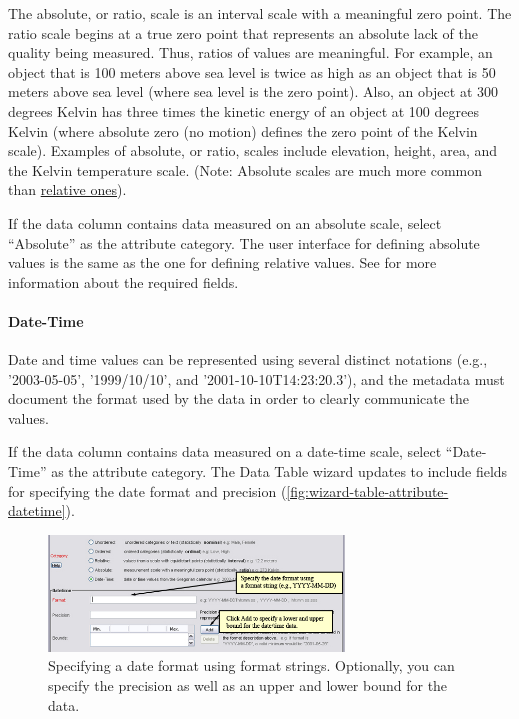 The absolute, or ratio, scale is an interval scale with a meaningful
zero point. The ratio scale begins at a true zero point that represents
an absolute lack of the quality being measured. Thus, ratios of values
are meaningful. For example, an object that is 100 meters above sea
level is twice as high as an object that is 50 meters above sea level
(where sea level is the zero point). Also, an object at 300 degrees
Kelvin has three times the kinetic energy of an object at 100 degrees
Kelvin (where absolute zero (no motion) defines the zero point of the
Kelvin scale). Examples of absolute, or ratio, scales include elevation,
height, area, and the Kelvin temperature scale. (Note: Absolute scales
are much more common than \hyperref[par:cat-relative]{relative ones}).

If the data column contains data measured on an absolute scale, select
``Absolute'' as the attribute category. The user interface for defining
absolute values is the same as the one for defining relative values. See
 for more information about the required
fields.

\paragraph{Date-Time} \label{par:cat-datetime}

Date and time values can be represented using several distinct notations
(e.g., '2003-05-05', '1999/10/10', and '2001-10-10T14:23:20.3'), and the
metadata must document the format used by the data in order to clearly
communicate the values.

If the data column contains data measured on a date-time scale, select
``Date-Time'' as the attribute category. The Data Table wizard updates to
include fields for specifying the date format and precision
(\autoref{fig:wizard-table-attribute-datetime}).

\begin{figure}
  \centering
    \includegraphics[width=0.7\textwidth]{images/wizard-table-attribute-datetime.jpg}
  \caption{Specifying a date format using format strings. Optionally,
    you can specify the precision as well as an upper and lower bound
    for the data.}
  \label{fig:wizard-table-attribute-datetime}
\end{figure}

